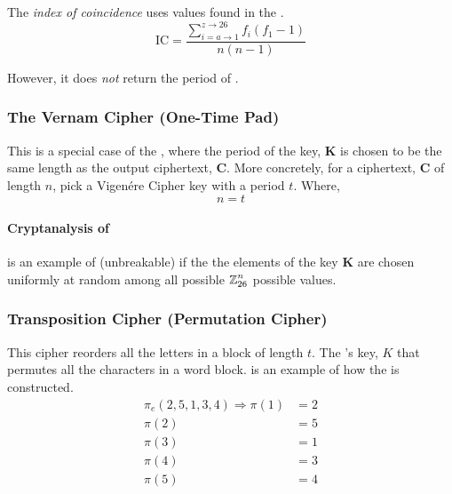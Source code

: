 \begin{definition}\label{def:Index_of_Coincidence}
  The \emph{index of coincidence} uses values found in the .
  \begin{equation}\label{eq:Index_of_Coincidence}
    \mathrm{IC} = \frac{\sum\limits_{i=a\to1}^{z\to26} f_{i} \left( f_{1} - 1 \right)}{n(n-1)}
  \end{equation}

  However, it does \emph{not} return the period of .
\end{definition}

\subsubsection{The Vernam Cipher (One-Time Pad)}\label{subsubsec:The_Vernam_Cipher}
This is a special case of the , where the period of the key, $\mathbf{K}$ is chosen to be the same length as the output ciphertext, $\mathbf{C}$.
More concretely, for a ciphertext, $\mathbf{C}$ of length $n$, pick a Vigen\'{e}re Cipher key with a period $t$.
Where,
\begin{equation*}
  n = t
\end{equation*}

\paragraph{Cryptanalysis of }
 is an example of  (unbreakable) if the the elements of the key $\mathbf{K}$ are chosen uniformly at random among all possible $\operatorname{\mathbb{Z}}_{26}^{n}$ possible values.

\subsubsection{Transposition Cipher (Permutation Cipher)}\label{subsubsec:Transposition_Cipher}
This cipher reorders all the letters in a block of length $t$.
The 's key, $K$ that permutes all the characters in a word block.
 is an example of how the  is constructed.
\begin{equation}\label{eq:Transposition_Cipher-Encryption}
  \begin{aligned}
    \pi_{e}(2, 5, 1, 3, 4) \Longrightarrow \pi(1) &= 2 \\
    \pi(2) &= 5 \\
    \pi(3) &= 1 \\
    \pi(4) &= 3 \\
    \pi(5) &= 4 \\
  \end{aligned}
\end{equation}

